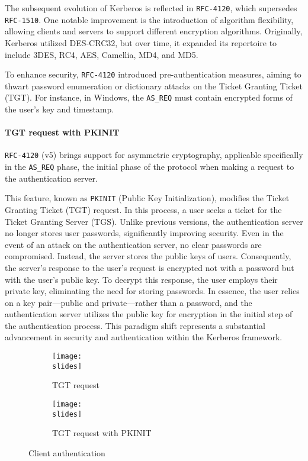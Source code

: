 The subsequent evolution of Kerberos is reflected in \texttt{RFC-4120}, which supersedes \texttt{RFC-1510}. One notable improvement is the introduction of algorithm flexibility, allowing clients and servers to support different encryption algorithms. Originally, Kerberos utilized DES-CRC32, but over time, it expanded its repertoire to include 3DES, RC4, AES, Camellia, MD4, and MD5.

To enhance security, \texttt{RFC-4120} introduced pre-authentication measures, aiming to thwart password enumeration or dictionary attacks on the Ticket Granting Ticket (TGT). For instance, in Windows, the \texttt{AS\_REQ} must contain encrypted forms of the user's key and timestamp.

\paragraph*{TGT request with PKINIT}
\texttt{RFC-4120} (v5) brings support for asymmetric cryptography, applicable specifically in the \texttt{AS\_REQ} phase, the initial phase of the protocol when making a request to the authentication server.


This feature, known as \texttt{PKINIT} (Public Key Initialization), modifies the Ticket Granting Ticket (TGT) request. In this process, a user seeks a ticket for the Ticket Granting Server (TGS). Unlike previous versions, the authentication server no longer stores user passwords, significantly improving security. Even in the event of an attack on the authentication server, no clear passwords are compromised. Instead, the server stores the public keys of users. Consequently, the server's response to the user's request is encrypted not with a password but with the user's public key. To decrypt this response, the user employs their private key, eliminating the need for storing passwords. In essence, the user relies on a key pair—public and private—rather than a password, and the authentication server utilizes the public key for encryption in the initial step of the authentication process. This paradigm shift represents a substantial advancement in security and authentication within the Kerberos framework.


\begin{figure}[H]
  \centering
  \begin{subfigure}{0.45\textwidth}
    \texttt{[image: \\slides]}
    \caption{TGT request}
  \end{subfigure}
  \hfill
  \begin{subfigure}{0.45\textwidth}
    \texttt{[image: \\slides]}
    \caption{TGT request with PKINIT}
  \end{subfigure}
  \caption{Client authentication}
\end{figure}



